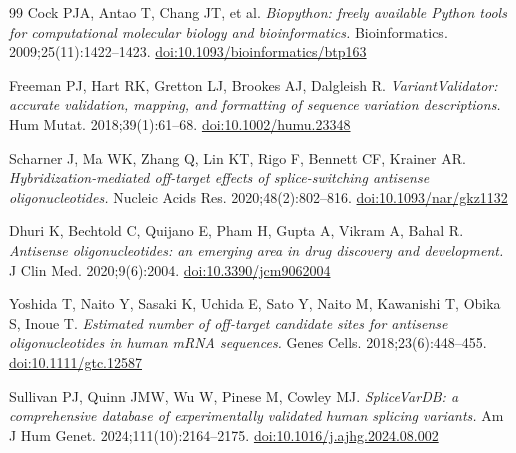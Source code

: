 \documentclass[11pt,a4paper]{article}
\begin{document}
\begin{thebibliography}{99}
Cock PJA, Antao T, Chang JT, et al. \emph{Biopython: freely available Python tools for computational
molecular biology and bioinformatics.} Bioinformatics. 2009;25(11):1422--1423.
\href{https://doi.org/10.1093/bioinformatics/btp163}{doi:10.1093/bioinformatics/btp163}

Freeman PJ, Hart RK, Gretton LJ, Brookes AJ, Dalgleish R.
\emph{VariantValidator: accurate validation, mapping, and formatting of sequence variation
descriptions.} Hum Mutat. 2018;39(1):61--68.
\href{https://doi.org/10.1002/humu.23348}{doi:10.1002/humu.23348}

Scharner J, Ma WK, Zhang Q, Lin KT, Rigo F, Bennett CF, Krainer AR.
\emph{Hybridization-mediated off-target effects of splice-switching antisense oligonucleotides.}
Nucleic Acids Res. 2020;48(2):802--816.
\href{https://doi.org/10.1093/nar/gkz1132}{doi:10.1093/nar/gkz1132}

Dhuri K, Bechtold C, Quijano E, Pham H, Gupta A, Vikram A, Bahal R.
\emph{Antisense oligonucleotides: an emerging area in drug discovery and development.}
J Clin Med. 2020;9(6):2004.
\href{https://doi.org/10.3390/jcm9062004}{doi:10.3390/jcm9062004}

Yoshida T, Naito Y, Sasaki K, Uchida E, Sato Y, Naito M, Kawanishi T, Obika S, Inoue T.
\emph{Estimated number of off-target candidate sites for antisense oligonucleotides in human mRNA
sequences.} Genes Cells. 2018;23(6):448--455.
\href{https://doi.org/10.1111/gtc.12587}{doi:10.1111/gtc.12587}

Sullivan PJ, Quinn JMW, Wu W, Pinese M, Cowley MJ.
\emph{SpliceVarDB: a comprehensive database of experimentally validated human splicing variants.}
Am J Hum Genet. 2024;111(10):2164--2175.
\href{https://doi.org/10.1016/j.ajhg.2024.08.002}{doi:10.1016/j.ajhg.2024.08.002}

\end{thebibliography}
\end{document}
